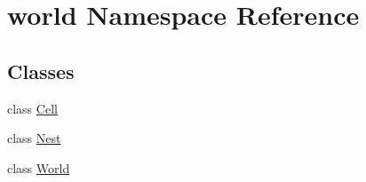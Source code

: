 \hypertarget{namespaceworld}{\section{world Namespace Reference}
\label{namespaceworld}
}
\subsection*{Classes}
\begin{DoxyCompactItemize}
\item 
class \hyperlink{classworld_1_1Cell}{Cell}
\item 
class \hyperlink{classworld_1_1Nest}{Nest}
\item 
class \hyperlink{classworld_1_1World}{World}
\end{DoxyCompactItemize}

